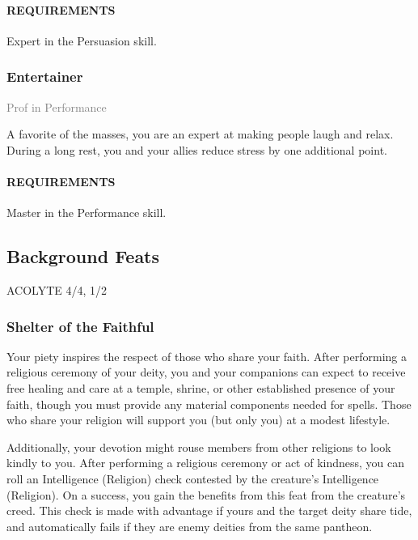 \paragraph{REQUIREMENTS} Expert in the Persuasion skill.

\subsubsection{Entertainer} \label{feat::entertainer}
\small{\textcolor{gray}{Prof in Performance}}

\normalsize
A favorite of the masses, you are an expert at making people laugh and relax.
During a long rest, you and your allies reduce stress by one additional point.
\paragraph{REQUIREMENTS} Master in the Performance skill.

\subsection*{Background Feats}
ACOLYTE 4/4, 1/2
    \subsubsection{Shelter of the Faithful} \label{feat::shelterofthefaithful}
        Your piety inspires the respect of those who share your faith.
        After performing a religious ceremony of your deity, you and your companions can expect to receive free healing and care at a temple, shrine, or other established presence of your faith, though you must provide any material components needed for spells.
        Those who share your religion will support you (but only you) at a modest lifestyle.

        Additionally, your devotion might rouse members from other religions to look kindly to you.
        After performing a religious ceremony or act of kindness, you can roll an Intelligence (Religion) check contested by the creature's Intelligence (Religion).
        On a success, you gain the benefits from this feat from the creature's creed.
        This check is made with advantage if yours and the target deity share tide, and automatically fails if they are enemy deities from the same pantheon.

